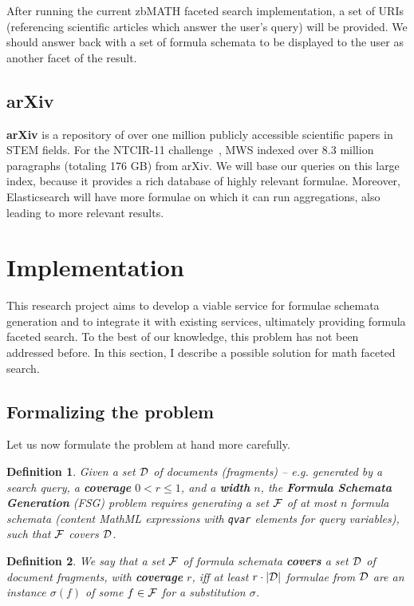 \documentclass[a4paper,11pt,oneside]{article}
\newtheorem{definition}{Definition}
\begin{document}
After running the current zbMATH faceted search implementation, a set of URIs
(referencing scientific articles which answer the user's query) will be
provided.  We should answer back with a set of formula schemata to be displayed
to the user as another facet of the result.

\subsection{arXiv}\label{subsec:arxiv}
\textbf{arXiv} is a repository of over one million publicly accessible
scientific papers in STEM fields. For the NTCIR-11
challenge~\cite{HamKohPro:man14},
MWS indexed over 8.3 million paragraphs (totaling 176 GB) from arXiv. We will
base our queries on this large index, because it provides a rich database of
highly relevant formulae. Moreover, Elasticsearch will have more formulae on
which it can run aggregations, also leading to more relevant results.


\section{Implementation}\label{sec:implementation}

This research project aims to develop a viable service for formulae schemata
generation and to integrate it with existing services, ultimately providing
formula faceted search. To the best of our knowledge, this problem has not been
addressed before. In this section, I describe a possible solution for math
faceted search.

\subsection{Formalizing the problem}\label{subsec:formal_problem}
Let us now formulate the problem at hand more carefully.

\begin{definition}
  Given a set $\mathcal{D}$ of documents (fragments) -- e.g. generated by a search
  query, a \textbf{coverage} $0<r\leq1$, and a \textbf{width} $n$, the
  \textbf{Formula Schemata Generation} (FSG) problem requires generating
  a set $\mathcal{F}$ of at most $n$ formula schemata (content MathML expressions with
  \lstinline|qvar| elements for query variables), such that $\mathcal{F}$ covers $\mathcal{D}$.
\end{definition}


\begin{definition}
  We say that a set $\mathcal{F}$ of formula schemata \textbf{covers} a set $\mathcal{D}$ of
  document fragments, with \textbf{coverage} $r$, iff at least $r \cdot |\mathcal{D}|$
  formulae from $\mathcal{D}$ are an instance $\sigma(f)$ of some $f\in\mathcal{F}$ for a
  substitution $\sigma$.
\end{definition}
\end{document}
